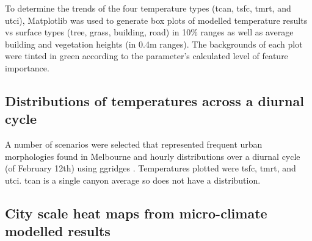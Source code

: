 \documentclass[final,3p,times,authoryear]{elsarticle}
\begin{document}
% 

To determine the trends of the four temperature types (\gls{tcan}, \gls{tsfc}, \gls{tmrt}, and \gls{utci}), Matplotlib \citep{Hunter2007} was used to generate box plots of modelled temperature results vs surface types (tree, grass, building, road) in 10\% ranges as well as average building and vegetation heights (in 0.4m ranges). The backgrounds of each plot were tinted in green according to the parameter's calculated level of feature importance.



\subsection{Distributions of temperatures across a diurnal cycle}\label{sec:methodsdist}
%
% 

A number of scenarios were selected that represented frequent urban morphologies found in Melbourne and hourly distributions over a diurnal cycle (of February 12th) using ggridges \citep{ggridges}. Temperatures plotted were \gls{tsfc}, \gls{tmrt}, and \gls{utci}. \gls{tcan} is a single canyon average so does not have a distribution.


\subsection{City scale heat maps from micro-climate modelled results}\label{sec:methodsheatmaps}
%
%  
\end{document}
